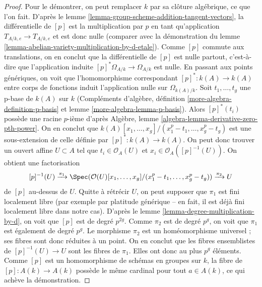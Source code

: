 \begin{proof}
Pour le démontrer, on peut remplacer $k$ par sa clôture algébrique, ce que l'on fait.
D'après le lemme \ref{lemma-group-scheme-addition-tangent-vectors},
la différentielle de $[p]$ est la multiplication par $p$ en tant qu'application
$T_{A/k, e} \to T_{A/k, e}$ et est donc nulle (comparer
avec la démonstration du lemme \ref{lemma-abelian-variety-multiplication-by-d-etale}).
Comme $[p]$ commute aux translations, on en conclut que la différentielle de $[p]$
est nulle partout, c'est-à-dire que l'application induite
$[p]^*\Omega_{A/k} \to \Omega_{A/k}$ est nulle.
En passant aux points génériques, on voit que
l'homomorphisme correspondant $[p]^* : k(A) \to k(A)$
entre corps de fonctions induit l'application nulle sur $\Omega_{k(A)/k}$.
Soit $t_1, \ldots, t_g$ une p-base de $k(A)$ sur $k$
(Compléments d'algèbre, définition \ref{more-algebra-definition-p-basis} et
lemme \ref{more-algebra-lemma-p-basis}). Alors $[p]^*(t_i)$
possède une racine $p$-ième d'après
Algèbre, lemme \ref{algebra-lemma-derivative-zero-pth-power}.
On en conclut que
$k(A)[x_1, \ldots, x_g]/(x_1^p - t_1, \ldots, x_g^p - t_g)$ est une sous-extension
de celle définie par $[p]^* : k(A) \to k(A)$.
On peut donc trouver un ouvert affine $U \subset A$ tel que
$t_i \in \mathcal{O}_A(U)$ et $x_i \in \mathcal{O}_A([p]^{-1}(U))$.
On obtient une factorisation
$$
[p]^{-1}(U)
\xrightarrow{\pi_1}
\Spec(\mathcal{O}(U)[x_1, \ldots, x_g]/(x_1^p - t_1, \ldots, x_g^p - t_g))
\xrightarrow{\pi_2}
U
$$
de $[p]$ au-dessus de $U$. Quitte à rétrécir $U$, on peut supposer que $\pi_1$
est fini localement libre (par exemple par platitude générique -- en fait, il est
déjà fini localement libre dans notre cas).
D'après le lemme \ref{lemma-degree-multiplication-by-d}, on voit que
$[p]$ est de degré $p^{2g}$. Comme $\pi_2$
est de degré $p^g$, on voit que $\pi_1$ est également de degré $p^g$.
Le morphisme $\pi_2$ est un homéomorphisme universel ; ses fibres sont donc
réduites à un point. On en conclut que les fibres ensemblistes de $[p]^{-1}(U) \to U$
sont les fibres de $\pi_1$. Elles
ont donc au plus $p^g$ éléments. Comme $[p]$ est un homomorphisme de schémas
en groupes sur $k$, la fibre de $[p] : A(k) \to A(k)$ possède le
même cardinal pour tout $a \in A(k)$, ce qui achève la démonstration.
\end{proof}

